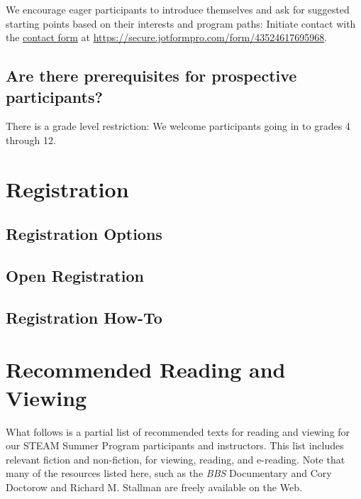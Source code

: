 \documentclass[letterpaper,10pt,english]{sphinxmanual}
\begin{document}
We encourage eager participants to introduce themselves and ask for suggested starting points based on their interests and program paths: Initiate contact with the \href{https://secure.jotformpro.com/form/43524617695968}{contact form} at \href{https://secure.jotformpro.com/form/43524617695968}{https://secure.jotformpro.com/form/43524617695968}.


\section{Are there prerequisites for prospective participants?}
\label{faq:are-there-prerequisites-for-prospective-participants}
There is a grade level restriction: We welcome participants going in to grades 4 through 12.


\chapter{Registration}
\label{registration::doc}\label{registration:index-0}\label{registration:registration}

\section{Registration Options}
\label{registration:registration-options}

\section{Open Registration}
\label{registration:open-registration}

\section{Registration How-To}
\label{registration:registration-how-to}

\chapter{Recommended Reading and Viewing}
\label{resources::doc}\label{resources:recommended-reading-and-viewing}
What follows is a partial list of recommended texts for reading and viewing for our STEAM Summer Program participants and instructors. This list includes relevant fiction and non-fiction, for viewing, reading, and e-reading. Note that many of the resources listed here, such as the \emph{BBS} Documentary and Cory Doctorow and Richard M. Stallman are freely available on the Web.
\end{document}
